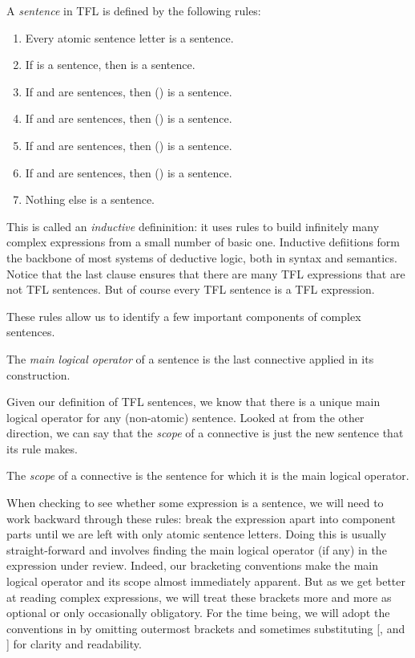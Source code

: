 \begin{definition}\label{def:tfl-sentence}
  A \emph{sentence} in TFL is defined by the following rules:
  \begin{enumerate}
  \item Every atomic sentence letter is a sentence.
  \item If \ephi is a sentence, then \enot\ephi is a sentence.
  \item If \ephi and \epsi are sentences, then (\ephi\eand\epsi) is a sentence.
  \item If \ephi and \epsi are sentences, then (\ephi\eor\epsi) is a sentence.
  \item If \ephi and \epsi are sentences, then (\ephi\eif\epsi) is a sentence.
  \item If \ephi and \epsi are sentences, then (\ephi\eiff\epsi) is a sentence.
  \item Nothing else is a sentence.
  \end{enumerate}
\end{definition}
This is called an \emph{inductive} defininition: it uses rules to build infinitely many
complex expressions from a small number of basic one. Inductive defiitions form the
backbone of most systems of deductive logic, both in syntax and semantics. Notice that
the last clause ensures that there are many TFL expressions that are not TFL sentences.
But of course every TFL sentence is a TFL expression.

These rules allow us to identify a few important components of complex
sentences.
\\
\begin{definition}
  The \emph{main logical operator} of a sentence is the last connective applied in its
  construction.
\end{definition}
Given our definition of TFL sentences, we know that there is a unique main logical
operator for any (non-atomic) sentence. Looked at from the other direction, we can
say that the \emph{scope} of a connective is just the new sentence that its rule makes.
\\
\begin{definition}
  The \emph{scope} of a connective is the sentence for which it is the main logical
  operator.
\end{definition}
When checking to see whether some expression is a sentence, we will need to work
backward through these rules: break the expression apart into component parts until we
are left with only atomic sentence letters. Doing this is usually straight-forward and
involves finding the main logical operator (if any) in the expression under review.
Indeed, our bracketing conventions make the main logical operator and its scope almost
immediately apparent. But as we get better at reading complex expressions, we will treat
these brackets more and more as optional or only occasionally obligatory. For the time
being, we will adopt the conventions in \cite[][]{Mag25} by omitting outermost brackets
and sometimes substituting [, and ] for clarity and readability.

